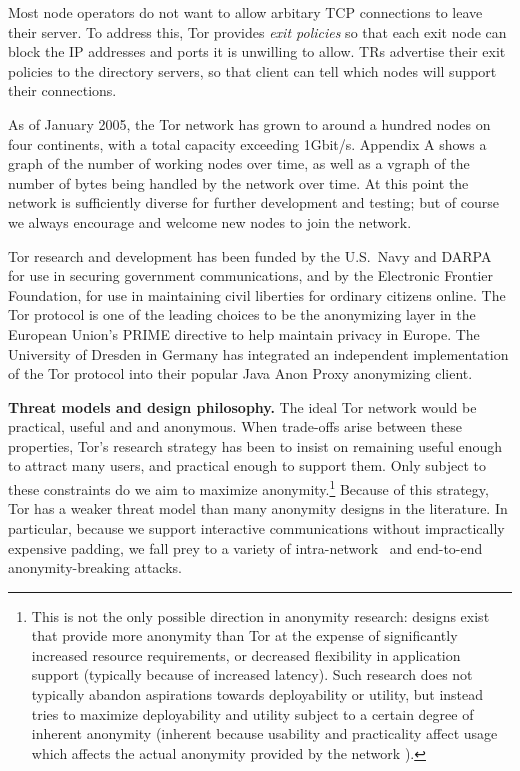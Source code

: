 \documentclass{llncs}
\begin{document}
Most node operators do not want to allow arbitary TCP connections to leave
their server.  To address this, Tor provides \emph{exit policies} so that
each exit node can block the IP addresses and ports it is unwilling to allow.
TRs advertise their exit policies to the directory servers, so that
client can tell which nodes will support their connections.

As of January 2005, the Tor network has grown to around a hundred nodes
on four continents, with a total capacity exceeding 1Gbit/s. Appendix A
shows a graph of the number of working nodes over time, as well as a
vgraph of the number of bytes being handled by the network over time. At
this point the network is sufficiently diverse for further development
and testing; but of course we always encourage and welcome new nodes
to join the network.

Tor research and development has been funded by the U.S.~Navy and DARPA
for use in securing government
communications, and by the Electronic Frontier Foundation, for use
in maintaining civil liberties for ordinary citizens online. The Tor
protocol is one of the leading choices
to be the anonymizing layer in the European Union's PRIME directive to
help maintain privacy in Europe. The University of Dresden in Germany
has integrated an independent implementation of the Tor protocol into
their popular Java Anon Proxy anonymizing client.

\medskip
\noindent
{\bf Threat models and design philosophy.}
The ideal Tor network would be practical, useful and and anonymous. When
trade-offs arise between these properties, Tor's research strategy has been
to insist on remaining useful enough to attract many users,
and practical enough to support them.  Only subject to these
constraints do we aim to maximize
anonymity.\footnote{This is not the only possible
direction in anonymity research: designs exist that provide more anonymity
than Tor at the expense of significantly increased resource requirements, or
decreased flexibility in application support (typically because of increased
latency).  Such research does not typically abandon aspirations towards
deployability or utility, but instead tries to maximize deployability and
utility subject to a certain degree of inherent anonymity (inherent because
usability and practicality affect usage which affects the actual anonymity
provided by the network \cite{back01,econymics}).}
Because of this strategy, Tor has a weaker threat model than many anonymity
designs in the literature.   In particular, because we
support interactive communications without impractically expensive padding,
we fall prey to a variety
of intra-network~\cite{back01,attack-tor-oak05,flow-correlation04} and
end-to-end~\cite{danezis-pet2004,SS03} anonymity-breaking attacks.
\end{document}
